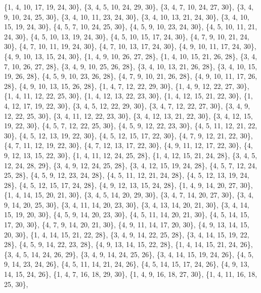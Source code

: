 \documentclass[11pt,a4paper]{article}
\begin{document}
{\{1, 4, 10, 17, 19, 24, 30\}, \{3, 4, 5, 10, 24, 29, 30\}, \{3, 4, 7, 10, 24, 27, 30\}, \{3, 4, 9, 10, 24, 25, 30\}, \{3, 4, 10, 11, 23, 24, 30\},
\{3, 4, 10, 13, 21, 24, 30\}, \{3, 4, 10, 15, 19, 24, 30\}, \{4, 5, 7, 10, 24, 25, 30\}, \{4, 5, 9, 10, 23, 24, 30\}, \{4, 5, 10, 11, 21, 24, 30\},
\{4, 5, 10, 13, 19, 24, 30\}, \{4, 5, 10, 15, 17, 24, 30\}, \{4, 7, 9, 10, 21, 24, 30\}, \{4, 7, 10, 11, 19, 24, 30\}, \{4, 7, 10, 13, 17, 24, 30\},
\{4, 9, 10, 11, 17, 24, 30\}, \{4, 9, 10, 13, 15, 24, 30\}, \{1, 4, 9, 10, 26, 27, 28\}, \{1, 4, 10, 15, 21, 26, 28\}, \{3, 4, 7, 10, 26, 27, 28\},
\{3, 4, 9, 10, 25, 26, 28\}, \{3, 4, 10, 13, 21, 26, 28\}, \{3, 4, 10, 15, 19, 26, 28\}, \{4, 5, 9, 10, 23, 26, 28\}, \{4, 7, 9, 10, 21, 26, 28\},
\{4, 9, 10, 11, 17, 26, 28\}, \{4, 9, 10, 13, 15, 26, 28\}, \{1, 4, 7, 12, 22, 29, 30\}, \{1, 4, 9, 12, 22, 27, 30\}, \{1, 4, 11, 12, 22, 25, 30\},
\{1, 4, 12, 13, 22, 23, 30\}, \{1, 4, 12, 15, 21, 22, 30\}, \{1, 4, 12, 17, 19, 22, 30\}, \{3, 4, 5, 12, 22, 29, 30\}, \{3, 4, 7, 12, 22, 27, 30\},
\{3, 4, 9, 12, 22, 25, 30\}, \{3, 4, 11, 12, 22, 23, 30\}, \{3, 4, 12, 13, 21, 22, 30\}, \{3, 4, 12, 15, 19, 22, 30\}, \{4, 5, 7, 12, 22, 25, 30\},
\{4, 5, 9, 12, 22, 23, 30\}, \{4, 5, 11, 12, 21, 22, 30\}, \{4, 5, 12, 13, 19, 22, 30\}, \{4, 5, 12, 15, 17, 22, 30\}, \{4, 7, 9, 12, 21, 22, 30\},
\{4, 7, 11, 12, 19, 22, 30\}, \{4, 7, 12, 13, 17, 22, 30\}, \{4, 9, 11, 12, 17, 22, 30\}, \{4, 9, 12, 13, 15, 22, 30\}, \{1, 4, 11, 12, 24, 25, 28\},
\{1, 4, 12, 15, 21, 24, 28\}, \{3, 4, 5, 12, 24, 28, 29\}, \{3, 4, 9, 12, 24, 25, 28\}, \{3, 4, 12, 15, 19, 24, 28\}, \{4, 5, 7, 12, 24, 25, 28\},
\{4, 5, 9, 12, 23, 24, 28\}, \{4, 5, 11, 12, 21, 24, 28\}, \{4, 5, 12, 13, 19, 24, 28\}, \{4, 5, 12, 15, 17, 24, 28\}, \{4, 9, 12, 13, 15, 24, 28\},
\{1, 4, 9, 14, 20, 27, 30\}, \{1, 4, 14, 15, 20, 21, 30\}, \{3, 4, 5, 14, 20, 29, 30\}, \{3, 4, 7, 14, 20, 27, 30\}, \{3, 4, 9, 14, 20, 25, 30\},
\{3, 4, 11, 14, 20, 23, 30\}, \{3, 4, 13, 14, 20, 21, 30\}, \{3, 4, 14, 15, 19, 20, 30\}, \{4, 5, 9, 14, 20, 23, 30\}, \{4, 5, 11, 14, 20, 21, 30\},
\{4, 5, 14, 15, 17, 20, 30\}, \{4, 7, 9, 14, 20, 21, 30\}, \{4, 9, 11, 14, 17, 20, 30\}, \{4, 9, 13, 14, 15, 20, 30\}, \{1, 4, 14, 15, 21, 22, 28\},
\{3, 4, 9, 14, 22, 25, 28\}, \{3, 4, 14, 15, 19, 22, 28\}, \{4, 5, 9, 14, 22, 23, 28\}, \{4, 9, 13, 14, 15, 22, 28\}, \{1, 4, 14, 15, 21, 24, 26\},
\{3, 4, 5, 14, 24, 26, 29\}, \{3, 4, 9, 14, 24, 25, 26\}, \{3, 4, 14, 15, 19, 24, 26\}, \{4, 5, 9, 14, 23, 24, 26\}, \{4, 5, 11, 14, 21, 24, 26\},
\{4, 5, 14, 15, 17, 24, 26\}, \{4, 9, 13, 14, 15, 24, 26\}, \{1, 4, 7, 16, 18, 29, 30\}, \{1, 4, 9, 16, 18, 27, 30\}, \{1, 4, 11, 16, 18, 25, 30\},
}
\end{document}
